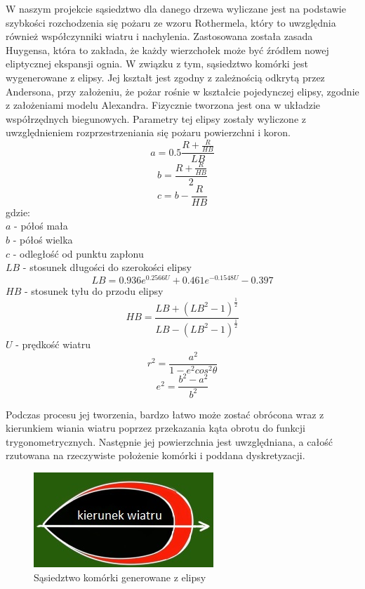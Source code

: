 \documentclass[a4paper, 11pt]{article}
\begin{document}
	W naszym projekcie sąsiedztwo dla danego drzewa wyliczane jest na podstawie szybkości rozchodzenia się pożaru ze wzoru Rothermela, który to uwzględnia również współczynniki wiatru i nachylenia. Zastosowana została zasada Huygensa, która to zakłada, że każdy wierzchołek może być źródłem nowej eliptycznej ekspansji ognia. W związku z tym, sąsiedztwo komórki jest wygenerowane z elipsy. Jej kształt jest zgodny z zależnością odkrytą przez Andersona, przy założeniu, że pożar rośnie w kształcie pojedynczej elipsy, zgodnie z założeniami modelu Alexandra. Fizycznie tworzona jest ona w układzie współrzędnych biegunowych. Parametry tej elipsy zostały wyliczone z uwzględnieniem rozprzestrzeniania się pożaru powierzchni i koron. 
	$$a = 0.5\frac{R+\frac{R}{HB}}{LB}$$	
	$$b = \frac{R + \frac{R}{HB}}{2}$$
	$$c = b - \frac{R}{HB}$$
	gdzie:\\
	$a$ - półoś mała \\	
	$b$ - półoś wielka \\
	$c$ - odległość od punktu zapłonu \\
	$LB$ - stosunek długości do szerokości elipsy $$LB = 0.936e^{0.2566U}+0.461e^{-0.1548U}-0.397$$
	$HB$ - stosunek tyłu do przodu elipsy $$HB = \frac{LB+(LB^2-1)^{\frac{1}{2}}}{LB-(LB^2-1)^{\frac{1}{2}}}$$
	$U$ - prędkość wiatru \\	

	$$ r^2 = \frac{a^2}{1-e^2cos^2\theta}  $$	
	$$e^2 = \frac{b^2 - a^2}{b^2}$$
	
	Podczas procesu jej tworzenia, bardzo łatwo może zostać obrócona wraz z kierunkiem wiania wiatru poprzez przekazania kąta obrotu do funkcji trygonometrycznych. Następnie jej powierzchnia jest uwzględniana, a całość rzutowana na rzeczywiste położenie komórki i poddana dyskretyzacji. 
	\begin{figure}[H]
		\centerline{\includegraphics[scale=1.0]{elipse}}
		\raggedright{	\caption{Sąsiedztwo komórki generowane z elipsy}}
	\end{figure}
	
	
\end{document}

